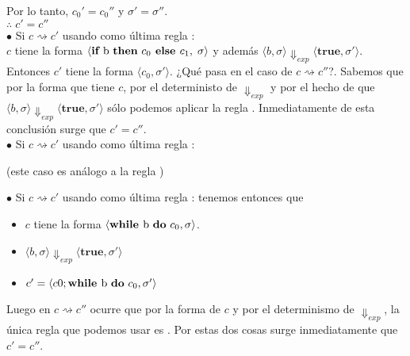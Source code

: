 \documentclass[11pt, fleqn]{article}
\begin{document}
Por lo tanto, $c_0' = c_0''$ y $\sigma' = \sigma''$. \\

$\therefore \; c' = c''$ \\


$\bullet$ Si $ c \rightsquigarrow c' $ usando como última regla : \\
$c$ tiene la forma $ \langle \textbf{if } \text{b \textbf{then} } c_0 \textbf{ else } c_1, \; \sigma \rangle$
y además $ \langle b, \sigma \rangle \Downarrow_{exp} \langle \textbf{true}, \sigma' \rangle$.
Entonces $c'$ tiene la forma $ \langle c_0, \sigma' \rangle$. ¿Qué pasa en el caso
de  $ c \rightsquigarrow c'' $?. Sabemos que por la forma que tiene $c$, por el 
deterministo de $\Downarrow_{exp}$ y por el hecho de
que $ \langle b, \sigma \rangle \Downarrow_{exp} \langle \textbf{true}, \sigma' \rangle$
sólo podemos aplicar la regla . Inmediatamente
de esta conclusión surge que $c' = c''$. \\


$\bullet$ Si $ c \rightsquigarrow c' $ usando como última regla :
\begin{center}(este caso es análogo a la regla )\end{center}


$\bullet$ Si $ c \rightsquigarrow c' $ usando como última regla : tenemos entonces que
\begin{itemize}
      \item $c$ tiene la forma $ \langle \textbf{while } \text{b \textbf{do} } c_0, \sigma \rangle$.
      \item $ \langle b, \sigma \rangle \Downarrow_{exp} \langle \textbf{true}, \sigma' \rangle$
      \item $c' = \langle c0; \textbf{while } \text{b \textbf{do} } c_0, \sigma' \rangle$
\end{itemize}

Luego en $ c \rightsquigarrow c'' $ ocurre que por la forma de $c$ y por el determinismo
de $\Downarrow_{exp}$, la única regla que podemos usar es . Por estas dos cosas
surge inmediatamente que $c' = c''$. \\
\end{document}
